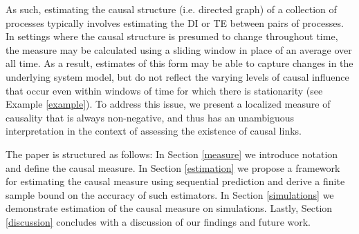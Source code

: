 As such, estimating the causal structure (i.e. directed graph) of a collection of processes typically involves estimating the DI or TE between pairs of processes. In settings where the causal structure is presumed to change throughout time, the measure may be calculated using a sliding window in place of an average over all time. As a result, estimates of this form may be able to capture changes in the underlying system model, but do not reflect the varying levels of causal influence that occur even within windows of time for which there is stationarity (see Example \ref{example}). To address this issue, we present a localized measure of causality that is always non-negative, and thus has an unambiguous interpretation in the context of assessing the existence of causal links.

The paper is structured as follows: In Section \ref{measure} we introduce notation and define the causal measure. In Section \ref{estimation} we propose a framework for estimating the causal measure using sequential prediction and derive a finite sample bound on the accuracy of such estimators. In Section \ref{simulations} we demonstrate estimation of the causal measure on simulations. Lastly, Section \ref{discussion} concludes with a discussion of our findings and future work.